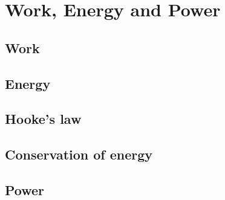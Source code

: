 \chapter{Work, Energy and Power}

\section{Work}
\section{Energy}
\section{Hooke’s law}
\section{Conservation of energy}
\section{Power}